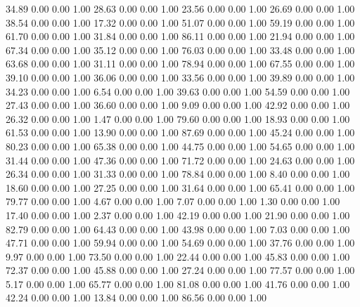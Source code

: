    34.89   0.00   0.00   1.00
   28.63   0.00   0.00   1.00
   23.56   0.00   0.00   1.00
   26.69   0.00   0.00   1.00
   38.54   0.00   0.00   1.00
   17.32   0.00   0.00   1.00
   51.07   0.00   0.00   1.00
   59.19   0.00   0.00   1.00
   61.70   0.00   0.00   1.00
   31.84   0.00   0.00   1.00
   86.11   0.00   0.00   1.00
   21.94   0.00   0.00   1.00
   67.34   0.00   0.00   1.00
   35.12   0.00   0.00   1.00
   76.03   0.00   0.00   1.00
   33.48   0.00   0.00   1.00
   63.68   0.00   0.00   1.00
   31.11   0.00   0.00   1.00
   78.94   0.00   0.00   1.00
   67.55   0.00   0.00   1.00
   39.10   0.00   0.00   1.00
   36.06   0.00   0.00   1.00
   33.56   0.00   0.00   1.00
   39.89   0.00   0.00   1.00
   34.23   0.00   0.00   1.00
    6.54   0.00   0.00   1.00
   39.63   0.00   0.00   1.00
   54.59   0.00   0.00   1.00
   27.43   0.00   0.00   1.00
   36.60   0.00   0.00   1.00
    9.09   0.00   0.00   1.00
   42.92   0.00   0.00   1.00
   26.32   0.00   0.00   1.00
    1.47   0.00   0.00   1.00
   79.60   0.00   0.00   1.00
   18.93   0.00   0.00   1.00
   61.53   0.00   0.00   1.00
   13.90   0.00   0.00   1.00
   87.69   0.00   0.00   1.00
   45.24   0.00   0.00   1.00
   80.23   0.00   0.00   1.00
   65.38   0.00   0.00   1.00
   44.75   0.00   0.00   1.00
   54.65   0.00   0.00   1.00
   31.44   0.00   0.00   1.00
   47.36   0.00   0.00   1.00
   71.72   0.00   0.00   1.00
   24.63   0.00   0.00   1.00
   26.34   0.00   0.00   1.00
   31.33   0.00   0.00   1.00
   78.84   0.00   0.00   1.00
    8.40   0.00   0.00   1.00
   18.60   0.00   0.00   1.00
   27.25   0.00   0.00   1.00
   31.64   0.00   0.00   1.00
   65.41   0.00   0.00   1.00
   79.77   0.00   0.00   1.00
    4.67   0.00   0.00   1.00
    7.07   0.00   0.00   1.00
    1.30   0.00   0.00   1.00
   17.40   0.00   0.00   1.00
    2.37   0.00   0.00   1.00
   42.19   0.00   0.00   1.00
   21.90   0.00   0.00   1.00
   82.79   0.00   0.00   1.00
   64.43   0.00   0.00   1.00
   43.98   0.00   0.00   1.00
    7.03   0.00   0.00   1.00
   47.71   0.00   0.00   1.00
   59.94   0.00   0.00   1.00
   54.69   0.00   0.00   1.00
   37.76   0.00   0.00   1.00
    9.97   0.00   0.00   1.00
   73.50   0.00   0.00   1.00
   22.44   0.00   0.00   1.00
   45.83   0.00   0.00   1.00
   72.37   0.00   0.00   1.00
   45.88   0.00   0.00   1.00
   27.24   0.00   0.00   1.00
   77.57   0.00   0.00   1.00
    5.17   0.00   0.00   1.00
   65.77   0.00   0.00   1.00
   81.08   0.00   0.00   1.00
   41.76   0.00   0.00   1.00
   42.24   0.00   0.00   1.00
   13.84   0.00   0.00   1.00
   86.56   0.00   0.00   1.00
